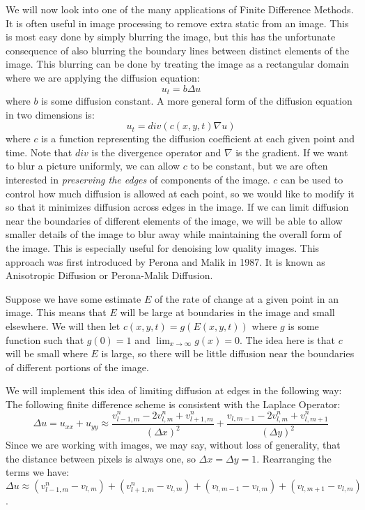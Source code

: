 \label{lab:AnisotropicDiffusion}


We will now look into one of the many applications of Finite Difference Methods.
It is often useful in image processing to remove extra static from an image.
This is most easy done by simply blurring the image, but this has the unfortunate consequence of also blurring the boundary lines between distinct elements of the image.
This blurring can be done by treating the image as a rectangular domain where we are applying the diffusion equation:
$$u_t = b \Delta u$$
where $b$ is some diffusion constant.
A more general form of the diffusion equation in two dimensions is:
$$u_t = div \left( c(x,y,t) \nabla u \right)$$
where $c$ is a function representing the diffusion coefficient at each given point and time.
Note that $div$ is the divergence operator and $\nabla$ is the gradient.
If we want to blur a picture uniformly, we can allow $c$ to be constant, but we are often interested in \textit{preserving the edges} of components of the image.
$c$ can be used to control how much diffusion is allowed at each point, so we would like to modify it so that it minimizes diffusion across edges in the image.
If we can limit diffusion near the boundaries of different elements of the image, we will be able to allow smaller details of the image to blur away while maintaining the overall form of the image.
This is especially useful for denoising low quality images. 
This approach was first introduced by Perona and Malik in 1987.
It is known as Anisotropic Diffusion or Perona-Malik Diffusion.

Suppose we have some estimate $E$ of the rate of change at a given point in an image.
This means that $E$ will be large at boundaries in the image and small elsewhere.
We will then let $c(x,y,t) = g(E(x,y,t))$ where $g$ is some function such that $g(0)=1$ and $\displaystyle{\lim_{x \to \infty} g(x) = 0}$. 
The idea here is that $c$ will be small where $E$ is large, so there will be little diffusion near the boundaries of different portions of the image.

We will implement this idea of limiting diffusion at edges in the following way:
The following finite difference scheme is consistent with the Laplace Operator:
$$\Delta u = u_{xx}+u_{yy} \approx \frac{v_{l-1,m}^n - 2 v_{l,m}^n + v_{l+1,m}^n}{(\Delta x)^2} + \frac{v_{l,m-1}-2 v_{l,m}^n + v_{l,m+1}^n}{(\Delta y)^2}$$
Since we are working with images, we may say, without loss of generality, that the distance between pixels is always one, so $\Delta x = \Delta y = 1$. Rearranging the terms we have:
$$ \Delta u \approx (v_{l-1,m}^n - v_{l,m}) + (v_{l+1,m}^n - v_{l,m}) + (v_{l,m-1} - v_{l,m}) + (v_{l,m+1} - v_{l,m})$$. 

